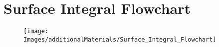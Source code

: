 \section{Surface Integral Flowchart}

\begin{figure}[H]
	\centering
	\hspace*{-1.5in}
	\texttt{[image: Images/additionalMaterials/Surface\_Integral\_Flowchart]}
\end{figure}

\pagebreak